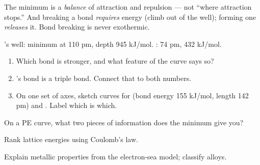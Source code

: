 \documentclass{apchem-notes}
\begin{document}
\begin{apctrap}
The minimum is a \emph{balance} of attraction and repulsion --- not ``where
attraction stops.'' And breaking a bond \emph{requires} energy (climb out of
the well); forming one \emph{releases} it. Bond breaking is never
exothermic.
\end{apctrap}


's well: minimum at 110 pm, depth 945 kJ/mol. : 74 pm,
432 kJ/mol.

\begin{enumerate}[leftmargin=*,itemsep=0.4em]
  \item Which bond is stronger, and what feature of the curve says so?
  \item {}'s bond is a triple bond. Connect that to both numbers.
  \item On one set of axes, sketch curves for  (bond energy
        155 kJ/mol, length 142 pm) and . Label which is which.
        \workspace[3.6cm]
\end{enumerate}

\begin{exitticket}
On a PE curve, what two pieces of information does the minimum give you?
\end{exitticket}


\begin{objectives}
  \item Rank lattice energies using Coulomb's law.
  \item Explain metallic properties from the electron-sea model; classify
        alloys.
\end{objectives}
\end{document}
